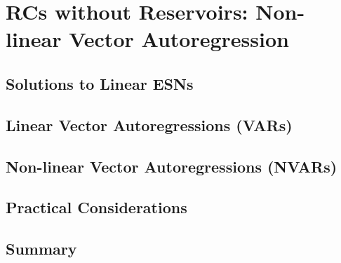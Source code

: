 \chapter{RCs without Reservoirs: Non-linear Vector Autoregression}\label{ch:nvar}


\section{Solutions to Linear ESNs}



\section{Linear Vector Autoregressions (VARs)}


\section{Non-linear Vector Autoregressions (NVARs)}


\section{Practical Considerations}


\section{Summary}

